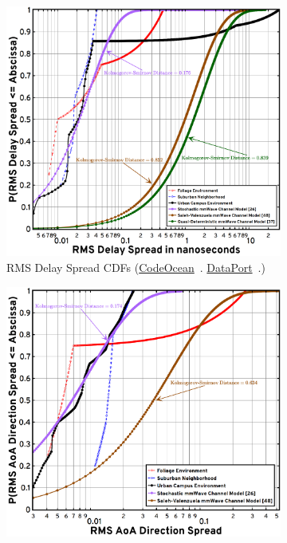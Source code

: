 \documentclass[10pt, twocolumn]{IEEEtran}
\begin{document}
{\begin{figure} [t]
    \centering
    \begin{subfigure}{0.494\linewidth}
        \centering
        \includegraphics[width=1.0\linewidth]{figs/rms_delay_spread.png}
        \caption{RMS Delay Spread CDFs (\href{https://codeocean.com/capsule/9545863/tree}{CodeOcean}~\cite{CodeOcean}. \href{http://ieee-dataport.org/12580}{DataPort}~\cite{DataPort}.)}
        \label{F11a}
    \end{subfigure}
    \begin{subfigure}{0.496\linewidth}
        \centering
        \includegraphics[width=1.0\linewidth]{figs/rms_aoa_direction_spread.png}

\end{subfigure}
\end{figure}}
\end{document}
